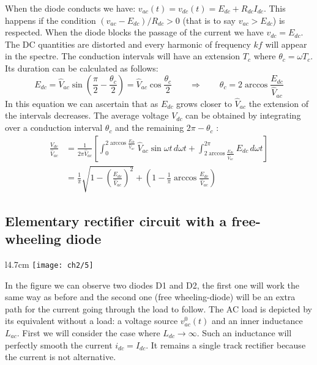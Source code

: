 				When the diode conducts we have: $v_{ac}(t) = v_{dc}(t) = E_{dc} + R_{dc}I_{dc}$. This happens if the condition $(v_{ac}-E_{dc})/R_{dc}>0$ (that is to say $v_{ac}>E_{dc}$) is respected. When the diode blocks the passage of the current we have $v_{dc} = E_{dc}$. The DC quantities are distorted and every harmonic of frequency $kf$ will appear in the spectre.
				The conduction intervals will have an extension $T_c$ where $\theta _c = \omega T_c$. Its duration can be calculated as follows:
				\begin{equation}
					E_{dc} = \hat{V}_{ac} \sin \left(\frac{\pi}{2} - \frac{\theta _c}{2}\right) = \hat{V}_{ac} \cos \frac{\theta _c}{2} \qquad \Rightarrow \qquad \theta _c = 2 \arccos \frac{E_{dc}}{\hat{V}_{ac}}
				\end{equation}
				In this equation we can ascertain that as $E_{dc}$ grows closer to $\hat{V}_{ac}$ the extension of the intervals decreases. The average voltage $V_{dc}$ can be obtained by integrating over a conduction interval $\theta _c$ and the remaining $2\pi - \theta _c$ : 
				\begin{equation}
				\begin{aligned}
					\frac{V_{dc}}{\hat{V}_{ac}} &= \frac{1}{2\pi\hat{V}_{ac}} \left[ \int _0 ^{2 \arccos \frac{E_{dc}}{\hat{V}_{ac}}} \hat{V}_{ac} \sin \omega t\,  d\omega t + \int _{2 \arccos \frac{E_{dc}}{\hat{V}_{ac}}} ^{2\pi} E_{dc} \, d\omega t \right]\\
								&= \frac{1}{\pi} \sqrt{1 - \left(\frac{E_{dc}}{\hat{V}_{ac}}\right)^2} + \left(1- \frac{1}{\pi} \arccos \frac{E_{dc}}{\hat{V}_{ac}} \right)
				\end{aligned}
				\end{equation}
				
	\subsection{Elementary rectifier circuit with a free-wheeling diode}
		\begin{wrapfigure}[11]{l}{4.7cm}
		\vspace{-5mm}
		\texttt{[image: ch2/5]}
		\end{wrapfigure}
		In the figure we can observe two diodes D1 and D2, the first one will work the same way as before and the second one (free wheeling-diode) will be an extra path for the current going through the load to follow. The AC load is depicted by its equivalent without a load: a voltage source $v_{ac}^0(t)$ and an inner inductance $L_{ac}$.
		First we will consider the case where $L_{dc} \rightarrow \infty$. Such an inductance will perfectly smooth the current $i_{dc} = I_{dc}$. It remains a single track rectifier because the current is not alternative. 
		
